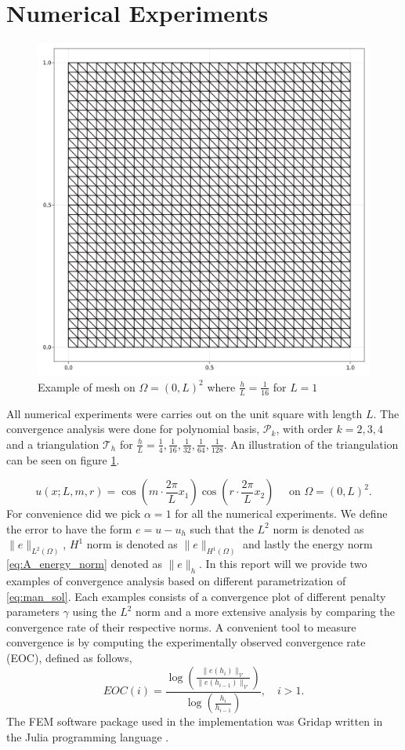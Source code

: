 


\newpage
\section{Numerical Experiments}%
\label{sub:manufactured_solution}

\begin{figure}[h!]
    \centering
    \includegraphics[width=0.4 \textwidth]{figures/model/l_1.0_m_1_r_1n_30_grid.png}
    \caption{Example of mesh on $ \Omega =  \left( 0,L  \right)^{2}$ where $\frac{h}{L}=\frac{1}{16}$ for $L=1$   }
    \label{fig:sol_l1_m1_r1}
\end{figure}

All numerical experiments were carries out on the unit square with length $L$. The convergence analysis were done for polynomial basis, $\mathcal{P}_{k} $, with order $k=2,3,4$ and a triangulation $\mathcal{T} _{h}$ for $\frac{h}{L} = \frac{1}{4},
\frac{1}{16}, \frac{1}{32},\frac{1}{64}, \frac{1}{128} $.
An illustration of the triangulation can be seen on figure \ref{fig:sol_l1_m1_r1}.


\begin{equation}
    \label{eq:man_sol}
u\left( x; L,m,r \right) = \cos\left(  m\cdot \frac{2\pi}{L}  x_{1}\right)  \cos \left(r\cdot  \frac{2\pi}{L} x_{2} \right) \quad \text{ on }   \Omega =  \left( 0,L  \right)^{2}
.\end{equation}
For convenience did we pick $\alpha = 1$ for all the numerical experiments. We define the error to have the form $e = u - u_{h}$ such that the $L^2$ norm is denoted as $\| e \|_{ L^{2}\left( \Omega  \right)   }^{  } $, $H^{1} $ norm is denoted as $\|
e \|_{ H^{1}\left( \Omega  \right)  }^{  } $ and lastly the energy norm  \eqref{eq:A_energy_norm} denoted as $\| e \|_{ h }^{  } $. In this report will we provide two examples of convergence analysis based on different
parametrization of \eqref{eq:man_sol}. Each examples consists of a convergence plot of different penalty parameters $\gamma$ using the $L^{2}$ norm and a more extensive analysis by comparing the convergence rate of their respective norms. A convenient tool to measure convergence is by computing the experimentally observed convergence rate (EOC), defined as follows,
\[
EOC(i) = \frac{\log\left( \frac{\| e\left( h_{i} \right)  \|_{ \mathcal{V}  }^{  }}{\| e\left( h_{i-1} \right) \|_{\mathcal{V}   }^{  } }   \right)}{\log\left( \frac{h_{i}}{h_{i-1}}  \right) }, \quad i>1   .
\]
The FEM software package used in the implementation was Gridap written in the Julia programming language \cite{verdugo22, julia17}.


